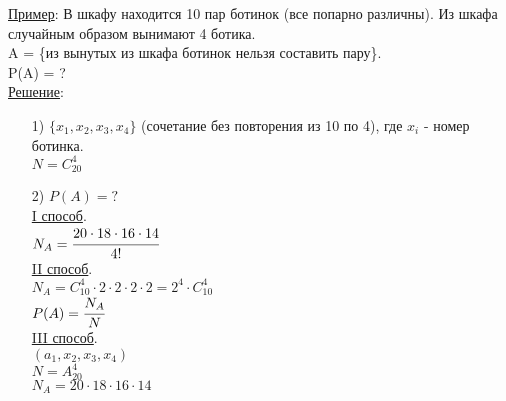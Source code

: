 \underline{Пример}: В шкафу находится 10 пар ботинок (все попарно различны). Из шкафа случайным образом вынимают 4 ботика. \\
A = \{из вынутых из шкафа ботинок нельзя составить пару\}. \\
P(A) = ? \\
\underline{Решение}: \\
\begin{enumerate}
\item[1)] %
$\{x_1, x_2, x_3, x_4\}$ (сочетание без повторения из 10 по 4), где $x_i$ - номер ботинка. \\
$N = C^4_20$ \\

\item[2)] $P(A) = ?$ \\
\underline{I способ}. \\
$N_A = \cfrac{20 \cdot 18 \cdot 16 \cdot 14}{4!}$ \\

\underline{II способ}. \\
$N_A = C^4_10 \cdot 2 \cdot 2 \cdot 2 \cdot 2 = 2^4 \cdot C^4_10$ \\
$P(A) = \cfrac{N_A}{N}$ \\

\underline{III способ}. \\
$(a_1, x_2, x_3, x_4)$ \\
$N = A^4_20$ \\
$N_A = 20 \cdot 18 \cdot 16 \cdot 14$ \\
\end{enumerate}


